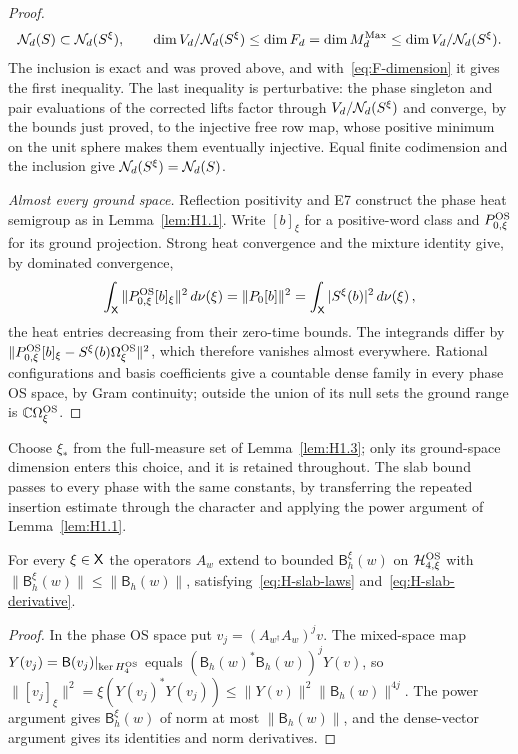 \begin{proof}
\begin{equation*}
\mathcal{N}_{d}(S)\subset\mathcal{N}_{d}(S^\xi),\qquad
\dim V_d/\mathcal{N}_{d}(S^\xi)\le\dim F_d=\dim M_{d}^{\mathrm{Max}}\le\dim V_d/\mathcal{N}_{d}(S^\xi).
\end{equation*}
The inclusion is exact and was proved above, and with~\eqref{eq:F-dimension} it gives the first inequality. The last inequality is perturbative: the phase singleton and pair evaluations of the corrected lifts factor through $V_d/\mathcal{N}_{d}(S^\xi)$ and converge, by the bounds just proved, to the injective free row map, whose positive minimum on the unit sphere makes them eventually injective. Equal finite codimension and the inclusion give $\mathcal{N}_{d}(S^\xi)=\mathcal{N}_{d}(S)$.

\emph{Almost every ground space.} Reflection positivity and E7 construct the phase heat semigroup as in Lemma~\ref{lem:H1.1}. Write $[b]_\xi$ for a positive-word class and $P_{0,\xi}^{\rm OS}$ for its ground projection. Strong heat convergence and the mixture identity give, by dominated convergence,
\begin{equation*}
\int_{\mathsf{X}}\|P_{0,\xi}^{\rm OS}[b]_\xi\|^2\,d\nu(\xi)
=\|P_0[b]\|^2=\int_{\mathsf{X}}|S^\xi(b)|^2\,d\nu(\xi)\,,
\end{equation*}
the heat entries decreasing from their zero-time bounds. The integrands differ by $\|P_{0,\xi}^{\rm OS}[b]_\xi-S^\xi(b)\Omega_\xi^{\rm OS}\|^2$, which therefore vanishes almost everywhere. Rational configurations and basis coefficients give a countable dense family in every phase OS space, by Gram continuity; outside the union of its null sets the ground range is $\mathbb{C}\Omega_\xi^{\rm OS}$.
\end{proof}

Choose $\xi_*$ from the full-measure set of Lemma~\ref{lem:H1.3}; only its ground-space dimension enters this choice, and it is retained throughout. The slab bound passes to every phase with the same constants, by transferring the repeated insertion estimate through the character and applying the power argument of Lemma~\ref{lem:H1.1}.
\begin{corollary}\label{cor:H-phase-slabs}\label{cor:H-phase-slab}
For every $\xi\in\mathsf{X}$ the operators $A_w$ extend to bounded $\mathsf B_h^\xi(w)$ on $\mathcal H_{4,\xi}^{\rm OS}$ with $\|\mathsf B_h^\xi(w)\|\le\|\mathsf B_h(w)\|$, satisfying~\eqref{eq:H-slab-laws} and~\eqref{eq:H-slab-derivative}.
\end{corollary}
\begin{proof}
In the phase OS space put $v_j=(A_{w^\dagger}A_w)^jv$. The mixed-space map $Y(v_j)=\mathsf B(v_j)|_{\ker H_4^{\rm OS}}$ equals $(\mathsf B_h(w)^*\mathsf B_h(w))^jY(v)$, so $\|[v_j]_\xi\|^2=\xi(Y(v_j)^*Y(v_j))\le\|Y(v)\|^2\|\mathsf B_h(w)\|^{4j}$. The power argument gives $\mathsf B_h^\xi(w)$ of norm at most $\|\mathsf B_h(w)\|$, and the dense-vector argument gives its identities and norm derivatives.
\end{proof}

